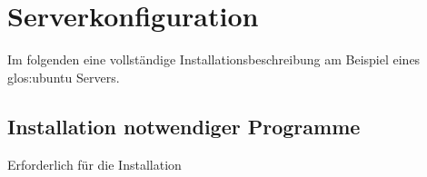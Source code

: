 \chapter{Serverkonfiguration}
Im folgenden eine vollständige Installationsbeschreibung am Beispiel eines
\Gls{glos:ubuntu} Servers.

\section{Installation notwendiger Programme}
Erforderlich für die Installation 

